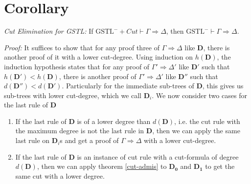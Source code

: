 \documentclass[a4paper, 12pt]{paper}
\begin{document}
\begin{itemize}
\begin{enumerate}[label=\Roman*]
\begin{itemize}
\begin{prooftree}
				\noLine
				
			\end{prooftree}
		\end{itemize}
	\end{enumerate}
\end{itemize}

\section{Corollary} \emph{Cut Elimination for GSTL: }
If $\text{GSTL}^- + Cut \vdash \Gamma \Rightarrow \Delta$, then $\text{GSTL}^- \vdash \Gamma \Rightarrow \Delta$.

\emph{Proof:} It suffices to show that for any proof three of $\Gamma \Rightarrow \Delta$ like $\mathbf{D}$, there is another proof of it with a lower cut-degree. Using induction on $h(\mathbf{D})$, the induction hypothesis states that for any proof of $\Gamma' \Rightarrow \Delta'$ like $\mathbf{D'}$ such that $h(\mathbf{D'}) < h(\mathbf{D})$, there is another proof of $\Gamma' \Rightarrow \Delta'$ like $\mathbf{D''}$ such that $d(\mathbf{D''}) < d(\mathbf{D'})$. Particularly for the immediate sub-trees of $\mathbf{D}$, this gives us sub-trees with lower cut-degree, which we call $\mathbf{D}_i$. We now consider two cases for the last rule of $\mathbf{D}$

\begin{enumerate}[label=\Roman*]
	\item If the last rule of $\mathbf{D}$ is of a lower degree than $d(\mathbf{D})$, i.e. the cut rule with the maximum degree is not the last rule in $\mathbf{D}$, then we can apply the same last rule on $\mathbf{D}_i$s and get a proof of $\Gamma \Rightarrow \Delta$ with a lower cut-degree.
	
	\item If the last rule of $\mathbf{D}$ is an instance of cut rule with a cut-formula of degree $d(\mathbf{D})$, then we can apply theorem \ref{cut-admis} to $\mathbf{D_0}$ and $\mathbf{D_1}$ to get the same cut with a lower degree.
\end{enumerate}
\end{document}
